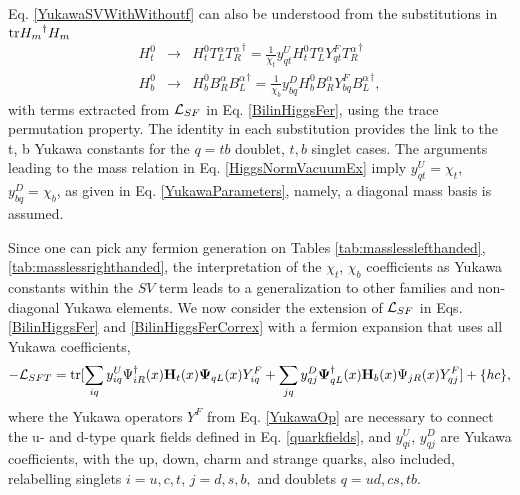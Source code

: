\documentclass[12pt]{article}
\renewcommand\[{\begin{dmath}}
\renewcommand\]{\end{dmath}}
\newcommand{\boldmathPsi}{\mbox{\boldmath$\Psi$\unboldmath}}
\begin{document}
 Eq. \ref{YukawaSVWithWithoutf} can also be understood from the substitutions in $ {\rm tr}      {   H_m } ^\dagger {   H_m}$
   \begin{eqnarray}
\label  {TransfoHFerBa}
  {   H}^0_{t}& \rightarrow   &   {    H}^0_{t}    { T}^\alpha_{L}  {T_R^\alpha}^\dagger = \frac{1}{\chi_t}y^U_{qt} {    H}^0_{t}    { T}^\alpha_{L}  Y^F_{qt}  {T_R^\alpha}^\dagger     \\ \nonumber
 {   H}^0_{b}& \rightarrow    &   {   H}^0_{b}    B_{R}^\alpha {{   B}^\alpha_{L}}^\dagger = \frac{1}{\chi_b}y^D_{bq}{   H}^0_{b}  B_{R}^\alpha Y^F_{bq}   {{   B}^\alpha_{L}}^\dagger  ,  \end{eqnarray}
with terms extracted from  $ {\cal L}_{SF}$ in Eq. \ref {BilinHiggsFer}, using the trace permutation property.
The identity in each substitution provides the
   link to the t, b Yukawa constants
for the    $q=tb$  doublet,  $t,b$ singlet  cases.  The arguments leading to the mass relation in Eq.  \ref{HiggsNormVacuumEx} imply  $y^U_{qt}=\chi_t$,  $y^D_{bq}=\chi_b$, as given in Eq.  \ref{YukawaParameters}, namely, a  diagonal mass  basis is assumed.

Since one can pick any   fermion generation on Tables  \ref{tab:masslesslefthanded}, \ref{tab:masslessrighthanded},
 the interpretation of the  $\chi_t$, $\chi_b$ coefficients as Yukawa constants within the $SV$ term leads to a generalization to other families and non-diagonal Yukawa elements.
We  now consider  the extension of ${\cal L } _{SF}$    in  Eqs. \ref{BilinHiggsFer} and  \ref{BilinHiggsFerCorrex}  with
  a  fermion expansion that uses   all Yukawa coefficients,
\begin{eqnarray}
\label {BilinHiggsGenYuka}
-{\cal L}_{SFT}=  {\rm tr}
   [ \sum_{iq} y^U_{iq}  \Psi_{iR}^\dagger(x) {\bf   H}_{t}(x)   { \boldmathPsi}_{qL}(x) Y^F_{iq} +\sum_{jq}
y^D_{qj} {  \boldmathPsi}_{qL}  ^\dagger(x) {\bf  H}_{b}(x)   \Psi_{jR} (x) Y^F_{qj}]    +\{ hc \},
\end{eqnarray}    where   the Yukawa operators $Y^F$  from Eq. \ref{YukawaOp} are necessary to connect  the u- and d-type quark fields  defined in Eq. \ref{quarkfields}, and  $y^U_{qi}$,   $y^D_{qj}$ are  Yukawa coefficients, with   the   up, down, charm  and strange quarks, also included,
relabelling singlets ${i}=u, c, t$,  ${j}= d, s, b,$  and doublets  ${q}= ud, cs, tb$.
\end{document}
